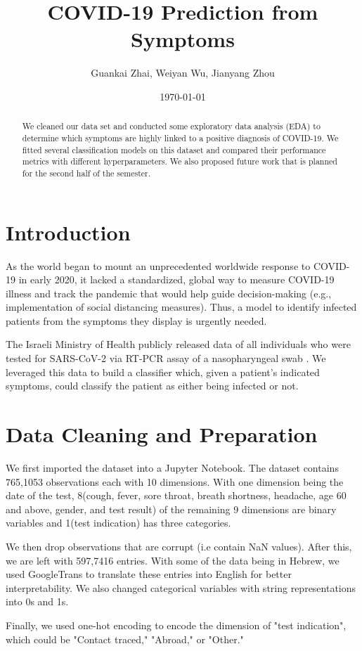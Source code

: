\documentclass[a4paper]{article}
\title{\vspace{-1cm}COVID-19 Prediction from Symptoms}
\author{Guankai Zhai, Weiyan Wu, Jianyang Zhou}
\date{\today} %
\begin{document}
\maketitle

\begin{abstract}
We cleaned our data set and conducted some exploratory data analysis (EDA) to determine which symptoms are highly linked to a positive diagnosis of COVID-19. We fitted several classification models on this dataset and compared their performance metrics with different hyperparameters. We also proposed future work that is planned for the second half of the semester. 
\end{abstract}
\section*{Introduction}
As the world began to mount an unprecedented worldwide response to COVID- 19 in early 2020, it lacked a standardized, global way to measure COVID-19 illness and track the pandemic that would help guide decision-making (e.g., implementation of social distancing measures). Thus, a model to identify infected patients from the symptoms they display is urgently needed. \par
The Israeli Ministry of Health publicly released data of all
individuals who were tested for SARS-CoV-2 via RT-PCR assay of a
nasopharyngeal swab \cite{data}. We leveraged this data to build a classifier which, given a patient's indicated symptoms, could classify the patient as either being infected or not.


\section*{Data Cleaning and Preparation}
We first imported the dataset into a Jupyter Notebook. The dataset contains 765,1053 observations each with 10 dimensions. With one dimension being the date of the test, 8(cough, fever, sore throat, breath shortness, headache, age 60 and above, gender, and test result) of the remaining 9 dimensions are binary variables and 1(test indication) has three categories. \par
We then drop observations that are corrupt (i.e contain NaN values). After this, we are left with 597,7416 entries. With some of the data being in Hebrew, we used GoogleTrans to translate these entries into English for better interpretability. We also changed categorical variables with string representations into 0s and 1s. \par
Finally, we used one-hot encoding to encode the dimension of "test indication", which could be "Contact traced," "Abroad," or "Other."
\end{document}
